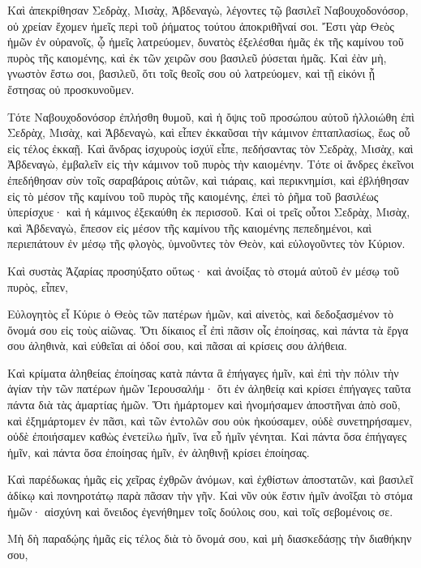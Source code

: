 {\par }{\PP {}Καὶ ἀπεκρίθησαν Σεδρὰχ, Μισὰχ, Ἀβδεναγὼ, λέγοντες τῷ βασιλεῖ Ναβουχοδονόσορ, οὐ χρείαν ἔχομεν ἡμεῖς περὶ τοῦ ῥήματος τούτου ἀποκριθῆναί σοι.
Ἔστι γὰρ Θεὸς ἡμῶν ἐν οὐρανοῖς, ᾧ ἡμεῖς λατρεύομεν, δυνατὸς ἐξελέσθαι ἡμᾶς ἐκ τῆς καμίνου τοῦ πυρὸς τῆς καιομένης, καὶ ἐκ τῶν χειρῶν σου βασιλεῦ ῥύσεται ἡμᾶς.
Καὶ ἐὰν μὴ, γνωστὸν ἔστω σοι, βασιλεῦ, ὅτι τοῖς θεοῖς σου οὐ λατρεύομεν, καὶ τῇ εἰκόνι ᾗ ἔστησας οὐ προσκυνοῦμεν.
\par }{\PP {}Τότε Ναβουχοδονόσορ ἐπλήσθη θυμοῦ, καὶ ἡ ὄψις τοῦ προσώπου αὐτοῦ ἠλλοιώθη ἐπὶ Σεδρὰχ, Μισὰχ, καὶ Ἀβδεναγὼ, καὶ εἶπεν ἐκκαῦσαι τὴν κάμινον ἐπταπλασίως, ἕως οὗ εἰς τέλος ἐκκαῇ.
Καὶ ἄνδρας ἰσχυροὺς ἰσχύϊ εἶπε, πεδήσαντας τὸν Σεδρὰχ, Μισὰχ, καὶ Ἀβδεναγὼ, ἐμβαλεῖν εἰς τὴν κάμινον τοῦ πυρὸς τὴν καιομένην.
Τότε οἱ ἄνδρες ἐκεῖνοι ἐπεδήθησαν σὺν τοῖς σαραβάροις αὐτῶν, καὶ τιάραις, καὶ περικνημίσι, καὶ ἐβλήθησαν εἰς τὸ μέσον τῆς καμίνου τοῦ πυρὸς τῆς καιομένης,
ἐπεὶ τὸ ῥῆμα τοῦ βασιλέως ὑπερίσχυε· καὶ ἡ κάμινος ἐξεκαύθη ἐκ περισσοῦ.
Καὶ οἱ τρεῖς οὗτοι Σεδρὰχ, Μισὰχ, καὶ Ἀβδεναγὼ, ἔπεσον εἰς μέσον τῆς καμίνου τῆς καιομένης πεπεδημένοι,
καὶ περιεπάτουν ἐν μέσῳ τῆς φλογὸς, ὑμνοῦντες τὸν Θεὸν, καὶ εὐλογοῦντες τὸν Κύριον.
\par }{\PP {}Καὶ συστὰς Ἀζαρίας προσηύξατο οὕτως· καὶ ἀνοίξας τὸ στομά αὐτοῦ ἐν μέσῳ τοῦ πυρὸς, εἶπεν,
\par }{\PP {}Εὐλογητὸς εἶ Κύριε ὁ Θεὸς τῶν πατέρων ἡμῶν, καὶ αἰνετὸς, καὶ δεδοξασμένον τὸ ὄνομά σου εἰς τοὺς αἰῶνας.
Ὅτι δίκαιος εἶ ἐπὶ πᾶσιν οἶς ἐποίησας, καὶ πάντα τὰ ἔργα σου ἀληθινὰ, καὶ εὐθεῖαι αἱ ὁδοί σου, καὶ πᾶσαι αἱ κρίσεις σου ἀλήθεια.
\par }{\PP {}Καὶ κρίματα ἀληθείας ἐποίησας κατὰ πάντα ἃ ἐπήγαγες ἡμῖν, καὶ ἐπὶ τὴν πόλιν τὴν ἁγίαν τὴν τῶν πατέρων ἡμῶν Ἱερουσαλήμ· ὅτι ἐν ἀληθείᾳ καὶ κρίσει ἐπήγαγες ταῦτα πάντα διὰ τὰς ἁμαρτίας ἡμῶν.
Ὅτι ἡμάρτομεν καὶ ἠνομήσαμεν ἀποστῆναι ἀπὸ σοῦ, καὶ ἐξημάρτομεν ἐν πᾶσι, καὶ τῶν ἐντολῶν σου οὐκ ἠκούσαμεν,
οὐδὲ συνετηρήσαμεν, οὐδὲ ἐποιήσαμεν καθὼς ἐνετείλω ἡμῖν, ἵνα εὖ ἡμῖν γένηται.
Καὶ πάντα ὅσα ἐπήγαγες ἡμῖν, καὶ πάντα ὅσα ἐποίησας ἡμῖν, ἐν ἀληθινῇ κρίσει ἐποίησας.
\par }{\PP {}Καὶ παρέδωκας ἡμᾶς εἰς χεῖρας ἐχθρῶν ἀνόμων, καὶ ἐχθίστων ἀποστατῶν, καὶ βασιλεῖ ἀδίκῳ καὶ πονηροτάτῳ παρὰ πᾶσαν τὴν γῆν.
Καὶ νῦν οὐκ ἔστιν ἡμῖν ἀνοῖξαι τὸ στόμα ἡμῶν· αἰσχύνη καὶ ὄνειδος ἐγενήθημεν τοῖς δούλοις σου, καὶ τοῖς σεβομένοις σε.
\par }{\PP {}Μὴ δὴ παραδῴης ἡμᾶς εἰς τέλος διὰ τὸ ὄνομά σου, καὶ μὴ διασκεδάσῃς τὴν διαθήκην σου,
}
